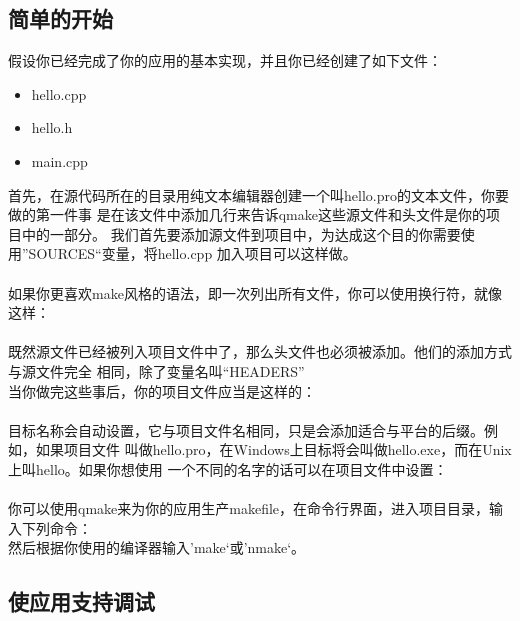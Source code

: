 \subsection{简单的开始}
假设你已经完成了你的应用的基本实现，并且你已经创建了如下文件：
\begin{itemize}
\item{hello.cpp}
\item{hello.h}
\item{main.cpp }
\end{itemize}
首先，在源代码所在的目录用纯文本编辑器创建一个叫hello.pro的文本文件，你要做的第一件事
是在该文件中添加几行来告诉qmake这些源文件和头文件是你的项目中的一部分。
我们首先要添加源文件到项目中，为达成这个目的你需要使用”SOURCES“变量，将hello.cpp
加入项目可以这样做。\\
{\color{seagreen}{
    SORUCES += hello.cpp
  }}\\
如果你更喜欢make风格的语法，即一次列出所有文件，你可以使用换行符，就像这样： \\
{}\\
既然源文件已经被列入项目文件中了，那么头文件也必须被添加。他们的添加方式与源文件完全
相同，除了变量名叫“HEADERS” \\
当你做完这些事后，你的项目文件应当是这样的：\\
{\color{seagreen}{
    HEADERS += hello.h\\
    SOURCES += hello.cpp\\
    SOURCES += main.cpp
  }}\\
目标名称会自动设置，它与项目文件名相同，只是会添加适合与平台的后缀。例如，如果项目文件
叫做hello.pro，在Windows上目标将会叫做hello.exe，而在Unix上叫hello。如果你想使用
一个不同的名字的话可以在项目文件中设置：\\
{\color{seagreen}{
    TARGET = helloworld
  }}\\
你可以使用qmake来为你的应用生产makefile，在命令行界面，进入项目目录，输入下列命令：\\
{\color{seagreen}{
    qmake -o Makefile hello.pro
  }}
然后根据你使用的编译器输入’make‘或’nmake‘。

\subsection{使应用支持调试}























